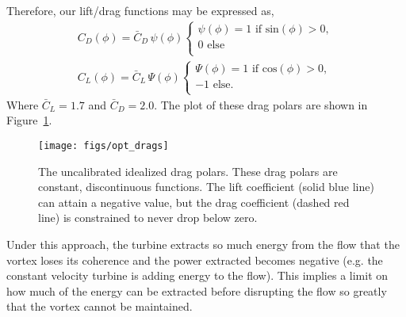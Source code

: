 Therefore, our lift/drag functions may be expressed as,
\begin{align*} 
 C_D(\phi) = \bar C_D \, \psi(\phi) 
  \begin{cases}
   \psi(\phi) = 1 \text{ if sin}(\phi) > 0,   \\
   0 \text{ else} \\
  \end{cases} \\
 C_L(\phi) = \bar C_L \, \Psi(\phi) 
  \begin{cases}
   \Psi(\phi) = 1 \text{ if cos}(\phi) > 0,   \\
   -1 \text{ else}. \\
  \end{cases}
\end{align*}
Where $\bar C_L = 1.7$ and $\bar C_D = 2.0$. The plot of these drag
polars are shown in Figure~\ref{drags}. 

\begin{figure}[!htb]
  \begin{center}
    \texttt{[image: figs/opt\_drags]}
    \caption{The uncalibrated idealized drag polars. 
   These drag polars are constant, discontinuous functions. The lift
   coefficient (solid blue line) can attain a negative value, but the
   drag coefficient (dashed red line) is constrained to never drop below
   zero.}  
    \label{drags}
  \end{center}
\end{figure}


Under this approach, the turbine extracts so much energy from the flow
that the vortex loses its coherence and the power extracted becomes
negative (e.g. the constant velocity turbine is adding energy to the
flow). This implies a limit on how much of the energy can be extracted
before disrupting the flow so greatly that the vortex cannot be
maintained.     

